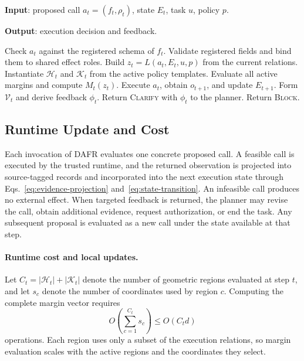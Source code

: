 \documentclass[letterpaper]{article}
\begin{document}
\begin{algorithm}[tb]
\caption{DAFR Execution-Step Decision}
\label{alg:dafr-step}
{\raggedright
\textbf{Input}: proposed call $a_t=(f_t,\rho_t)$, state $E_t$, task $u$, policy $p$.\par
\textbf{Output}: execution decision and feedback.\par
}
\begin{algorithmic}[1]
\STATE Check $a_t$ against the registered schema of $f_t$.
\STATE Validate registered fields and bind them to shared effect roles.
\STATE Build $z_t=L(a_t,E_t,u,p)$ from the current relations.
\STATE Instantiate $\mathcal H_t$ and $\mathcal K_t$ from the active policy templates.
\STATE Evaluate all active margins and compute $M_t(z_t)$.
\STATE Execute $a_t$, obtain $o_{t+1}$, and update $E_{t+1}$.
\ELSE
\STATE Form $\mathcal V_t$ and derive feedback $\phi_t$.
\STATE Return \textsc{Clarify} with $\phi_t$ to the planner.
\ELSE
\STATE Return \textsc{Block}.
\ENDIF
\ENDIF
\end{algorithmic}
\end{algorithm}

\subsection{Runtime Update and Cost}

Each invocation of DAFR evaluates one concrete proposed call. A feasible call is executed by the trusted runtime, and the returned observation is projected into source-tagged records and incorporated into the next execution state through Eqs.~\eqref{eq:evidence-projection} and~\eqref{eq:state-transition}. An infeasible call produces no external effect. When targeted feedback is returned, the planner may revise the call, obtain additional evidence, request authorization, or end the task. Any subsequent proposal is evaluated as a new call under the state available at that step.

\paragraph{Runtime cost and local updates.}
Let $C_t=|\mathcal H_t|+|\mathcal K_t|$ denote the number of geometric regions evaluated at step $t$, and let $s_c$ denote the number of coordinates used by region $c$. Computing the complete margin vector requires
\begin{equation}
 O\left(\sum_{c=1}^{C_t}s_c\right)\leq O(C_td)
 \label{eq:runtime-cost}
\end{equation}
operations. Each region uses only a subset of the execution relations, so margin evaluation scales with the active regions and the coordinates they select.
\end{document}
